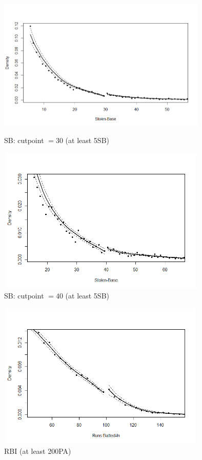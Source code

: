 \documentclass[dvipdfmx, 12pt]{article}
\begin{document}
\begin{figure}[H]
  \centering
  \includegraphics[width = 10cm, height = 7cm]{graphs/SB_30.png}
  \caption{SB: cutpoint $=30$ (at least 5SB)}
  \label{SB_30}
\end{figure}
\begin{figure}[H]
  \centering
  \includegraphics[width = 10cm, height = 7cm]{graphs/SB_40.png}
  \caption{SB: cutpoint $=40$ (at least 5SB)}
  \label{SB_40}
\end{figure}
\begin{figure}[H]
  \centering
  \includegraphics[width = 10cm, height = 7cm]{graphs/RBI_100.png}
  \caption{RBI (at least 200PA)}
  \label{RBI_100}
\end{figure}
\end{document}

